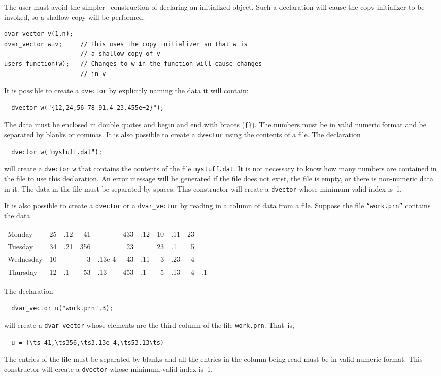 \documentclass{admbmanual}
\makeatletter
\newenvironment{daysdecimaltable}
  {
    \par
    \medskip
    \begin{tabular}{l @{\qquad} *{10}{r@{}l} }
  }
  {
    \end{tabular}
    \bigskip
    \par
  }
\makeatother
\begin{document}
The user must avoid the simpler \cplus\ construction of declaring an initialized
object. Such a declaration will cause the copy initializer to be invoked, so a
shallow copy will be performed.
\begin{lstlisting}
dvar_vector v(1,n);
dvar_vector w=v;     // This uses the copy initializer so that w is
                     // a shallow copy of v
users_function(w);   // Changes to w in the function will cause changes
                     // in v
\end{lstlisting}

It is possible to create a \texttt{dvector} by explicitly naming the data it
will contain: 
\begin{lstlisting}
  dvector w("{12,24,56 78 91.4 23.455e+2}");
\end{lstlisting}

The data must be enclosed in double quotes and begin and end with braces
(\texttt{\{{}\}}). The numbers must be in valid numeric format and be separated
by blanks or commas. It is also possible to create a \texttt{dvector} using the
contents of a file. The declaration
\begin{lstlisting}
  dvector w("mystuff.dat");
\end{lstlisting}
will create a \texttt{dvector} \texttt{w} that contains the contents of the file
\texttt{mystuff.dat}. It is not necessary to know how many numbers are contained
in the file to use this declaration. An error message will be generated if the
file does not exist, the file is empty, or there is non-numeric data in it. The
data in the file must be separated by spaces. This constructor will create a
\texttt{dvector} whose minimum valid index is~1.

It is also possible to create a \texttt{dvector} or a \texttt{dvar\_vector} by
reading in a column of data from a file. Suppose the file \texttt{``work.prn''}
contains the data
\begin{daysdecimaltable}
  Monday     & 25&.12 & -41&       & 433&.12 & 10&.11 & 23& \\
  Tuesday    & 34&.21 & 356&       &  23&    & 23&.1  &  5& \\
  Wednesday  & 10&    &   3&.13e-4 &  43&.11 &  3&.23 &  4& \\
  Thursday   & 12&.1  &  53&.13    & 453&.1  & -5&.13 &  4&.1 \\
\end{daysdecimaltable}
The declaration
\begin{lstlisting}
  dvar_vector u("work.prn",3);
\end{lstlisting}
will create a \texttt{dvar\_vector} whose elements are the third column of the
file \texttt{work.prn}. That~is,
\begin{lstlisting}
  u = (\ts-41,\ts356,\ts3.13e-4,\ts53.13\ts)
\end{lstlisting}
The entries of the file must be separated by blanks and all the entries in the
column being read must be in valid numeric format. This constructor will create
a \texttt{dvector} whose minimum valid index is~1.
\end{document}
